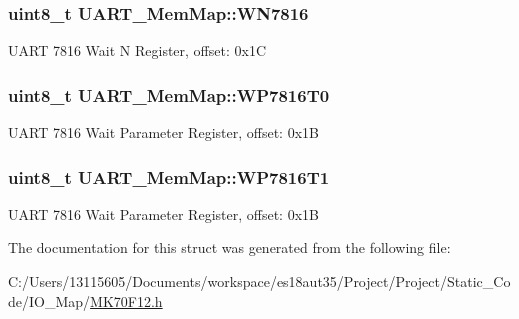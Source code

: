 \subsubsection[{W\+N7816}]{\setlength{\rightskip}{0pt plus 5cm}uint8\+\_\+t U\+A\+R\+T\+\_\+\+Mem\+Map\+::\+W\+N7816}\label{struct_u_a_r_t___mem_map_aed09f864d4f1afe57f146ff72949c3d2}
U\+A\+R\+T 7816 Wait N Register, offset\+: 0x1\+C \hypertarget{struct_u_a_r_t___mem_map_a4555ab88b0e4f56c44b30d549b5b0666}{}
\subsubsection[{W\+P7816\+T0}]{\setlength{\rightskip}{0pt plus 5cm}uint8\+\_\+t U\+A\+R\+T\+\_\+\+Mem\+Map\+::\+W\+P7816\+T0}\label{struct_u_a_r_t___mem_map_a4555ab88b0e4f56c44b30d549b5b0666}
U\+A\+R\+T 7816 Wait Parameter Register, offset\+: 0x1\+B \hypertarget{struct_u_a_r_t___mem_map_a7d456ca4a3be9b4c083253fe2d30d404}{}
\subsubsection[{W\+P7816\+T1}]{\setlength{\rightskip}{0pt plus 5cm}uint8\+\_\+t U\+A\+R\+T\+\_\+\+Mem\+Map\+::\+W\+P7816\+T1}\label{struct_u_a_r_t___mem_map_a7d456ca4a3be9b4c083253fe2d30d404}
U\+A\+R\+T 7816 Wait Parameter Register, offset\+: 0x1\+B 

The documentation for this struct was generated from the following file\+:\begin{DoxyCompactItemize}
\item 
C\+:/\+Users/13115605/\+Documents/workspace/es18aut35/\+Project/\+Project/\+Static\+\_\+\+Code/\+I\+O\+\_\+\+Map/\hyperlink{_m_k70_f12_8h}{M\+K70\+F12.\+h}\end{DoxyCompactItemize}
